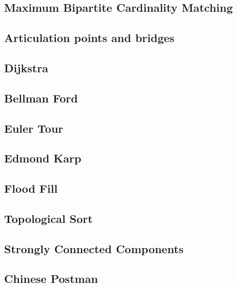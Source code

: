 \documentclass[twocolumn,8pt]{article}
\begin{document}
\subsection{Maximum Bipartite Cardinality Matching}


\subsection{Articulation points and bridges}


\subsection{Dijkstra}


\subsection{Bellman Ford}


\subsection{Euler Tour}


\subsection{Edmond Karp}


\subsection{Flood Fill}


\subsection{Topological Sort}


\subsection{Strongly Connected Components}


\subsection{Chinese Postman}

\end{document}
